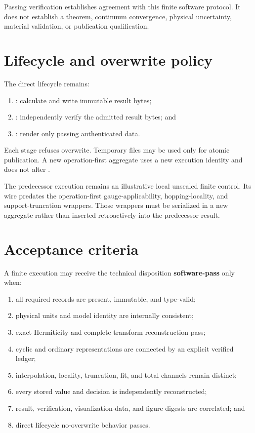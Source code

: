 \documentclass[11pt]{article}
\begin{document}
Passing verification establishes agreement with this finite software protocol.  It does
not establish a theorem, continuum convergence, physical uncertainty, material
validation, or publication qualification.

\section{Lifecycle and overwrite policy}

The direct lifecycle remains:
\begin{enumerate}[leftmargin=*]
  \item {}: calculate and write immutable result bytes;
  \item {}: independently verify the admitted result bytes;
    and
  \item {}: render only passing authenticated data.
\end{enumerate}
Each stage refuses overwrite.  Temporary files may be used only for atomic publication.
A new operation-first aggregate uses a new execution identity and does not alter
.

The predecessor execution remains an illustrative local unsealed finite control.  Its
wire predates the operation-first gauge-applicability, hopping-locality, and
support-truncation wrappers.  Those wrappers must be serialized in a new aggregate rather
than inserted retroactively into the predecessor result.

\section{Acceptance criteria}

A finite execution may receive the technical disposition \textbf{software-pass} only
when:
\begin{enumerate}[leftmargin=*]
  \item all required records are present, immutable, and type-valid;
  \item physical units and model identity are internally consistent;
  \item exact Hermiticity and complete transform reconstruction pass;
  \item cyclic and ordinary representations are connected by an explicit verified
    ledger;
  \item interpolation, locality, truncation, fit, and total channels remain distinct;
  \item every stored value and decision is independently reconstructed;
  \item result, verification, visualization-data, and figure digests are correlated; and
  \item direct lifecycle no-overwrite behavior passes.
\end{enumerate}
\end{document}

